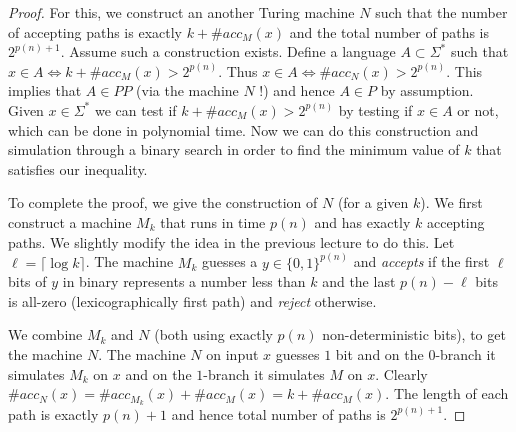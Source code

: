\documentclass{report}
\begin{document}
\begin{proof}
For this, we construct an another Turing machine $N$ such that the number of accepting paths is exactly $k+\#acc_M(x)$ and the total number of paths is $2^{p(n)+1}$. Assume such a construction exists. Define a language $A \subset \Sigma^*$ such that $x \in A \iff k+\#acc_M(x) > 2^{p(n)}$. Thus $x \in A \iff \#acc_N(x) > 2^{p(n)}$. This implies that $A \in PP$ (via the machine $N$ !) and hence $A \in P$ by assumption. Given $x \in \Sigma^*$ we can test if $k+\#acc_M(x) > 2^{p(n)}$ by testing if $x \in A$ or not, which can be done in polynomial time. Now we can do this construction and simulation through a binary search in order to find the minimum value of $k$ that satisfies our inequality.

To complete the proof, we give the construction of $N$ (for a given $k$). 
We first construct a machine $M_k$ that runs in time $p(n)$ and has exactly $k$ accepting paths. 
We slightly modify the idea in the previous lecture to do this. Let $\ell = \lceil \log k \rceil$.
The machine $M_k$ guesses a $y \in \{0,1\}^{p(n)}$ and {\em accepts} if the first $\ell$ bits of $y$ in binary represents a number less than $k$ and the last $p(n)-\ell$  bits is all-zero (lexicographically first path) and {\em reject} otherwise.

We combine $M_k$ and $N$ (both using exactly $p(n)$ non-deterministic bits), to get the machine $N$. The machine $N$ on input $x$ guesses $1$ bit and on the $0$-branch it simulates $M_k$ on $x$ and on the $1$-branch it simulates $M$ on $x$. Clearly $\#acc_N(x) = \#acc_{M_k}(x) + \#acc_{M}(x) = k+\#acc_{M}(x)$. The length of each path is exactly $p(n)+1$ and hence total number of paths is $2^{p(n)+1}$.
\end{proof}

\ifnum{}
\end{document}
